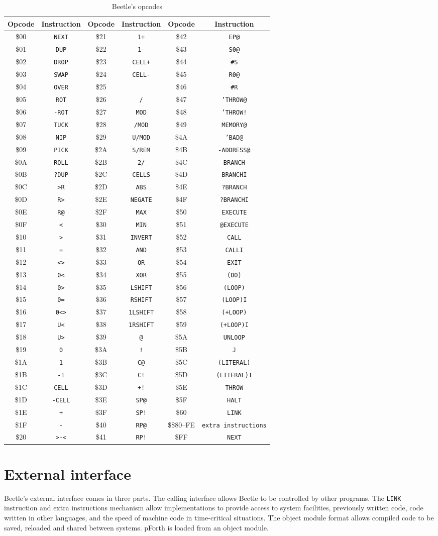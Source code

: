 \documentclass{article}
\newcommand{\opcodetbl}[6]{\$#1 & {\tt #2} & \$#3 & {\tt #4} & \$#5 & {\tt #6}
\\}
\begin{document}
\begin{table}[htb]
\begin{center}
\begin{tabular}{*{3}{cc}} \toprule
\bf Opcode & \bf Instruction & \bf Opcode & \bf
    Instruction & \bf Opcode & \bf Instruction \\ \midrule
\opcodetbl{00}{NEXT}	{21}{1+}	{42}{EP@}
\opcodetbl{01}{DUP}	{22}{1-}	{43}{S0@}
\opcodetbl{02}{DROP}	{23}{CELL+}	{44}{\#S}
\opcodetbl{03}{SWAP}	{24}{CELL-}	{45}{R0@}
\opcodetbl{04}{OVER}	{25}{*}		{46}{\#R}
\opcodetbl{05}{ROT}	{26}{/}		{47}{'THROW@}
\opcodetbl{06}{-ROT}	{27}{MOD}	{48}{'THROW!}
\opcodetbl{07}{TUCK}	{28}{/MOD}	{49}{MEMORY@}
\opcodetbl{08}{NIP}	{29}{U/MOD}	{4A}{'BAD@}
\opcodetbl{09}{PICK}	{2A}{S/REM}	{4B}{-ADDRESS@}
\opcodetbl{0A}{ROLL}	{2B}{2/}	{4C}{BRANCH}
\opcodetbl{0B}{?DUP}	{2C}{CELLS}	{4D}{BRANCHI}
\opcodetbl{0C}{>R}	{2D}{ABS}	{4E}{?BRANCH}
\opcodetbl{0D}{R>}	{2E}{NEGATE}	{4F}{?BRANCHI}
\opcodetbl{0E}{R@}	{2F}{MAX}	{50}{EXECUTE}
\opcodetbl{0F}{<}	{30}{MIN}	{51}{@EXECUTE}
\opcodetbl{10}{>}	{31}{INVERT}	{52}{CALL}
\opcodetbl{11}{=}	{32}{AND}	{53}{CALLI}
\opcodetbl{12}{<>}	{33}{OR}	{54}{EXIT}
\opcodetbl{13}{0<}	{34}{XOR}	{55}{(DO)}
\opcodetbl{14}{0>}	{35}{LSHIFT}	{56}{(LOOP)}
\opcodetbl{15}{0=}	{36}{RSHIFT}	{57}{(LOOP)I}
\opcodetbl{16}{0<>}	{37}{1LSHIFT}	{58}{(+LOOP)}
\opcodetbl{17}{U<}	{38}{1RSHIFT}	{59}{(+LOOP)I}
\opcodetbl{18}{U>}	{39}{@}		{5A}{UNLOOP}
\opcodetbl{19}{0}	{3A}{!}		{5B}{J}
\opcodetbl{1A}{1}	{3B}{C@}	{5C}{(LITERAL)}
\opcodetbl{1B}{-1}	{3C}{C!}        {5D}{(LITERAL)I}
\opcodetbl{1C}{CELL}	{3D}{+!}        {5E}{THROW}
\opcodetbl{1D}{-CELL}	{3E}{SP@}	{5F}{HALT}
\opcodetbl{1E}{+}	{3F}{SP!}       {60}{LINK}
\opcodetbl{1F}{-}	{40}{RP@}	{\$80–FE}{\textrm{extra instructions}}
\opcodetbl{20}{>-<}	{41}{RP!}       {FF}{NEXT}
 \bottomrule
\end{tabular}
\caption{\label{opcodetable}Beetle's opcodes}
\end{center}
\end{table}


\section{External interface}

Beetle's external interface comes in three parts. The calling interface allows
Beetle to be controlled by other programs. The {\tt LINK} instruction and extra instructions mechanism allow implementations to provide access to system facilities, previously written code,
code written in other languages, and the speed of machine code in time-critical
situations. The object module format allows compiled code to be saved, reloaded
and shared between systems. pForth is loaded from an object module.
\end{document}
